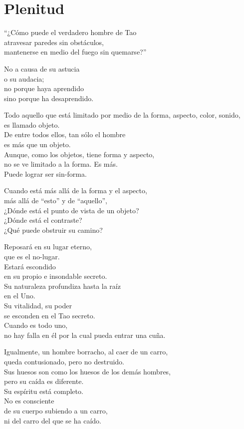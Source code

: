 \documentclass[book,b5paper,hidelinks,final]{memoir}
\begin{document}
	\chapter*{Plenitud}
	
	``¿Cómo puede el verdadero hombre de Tao\\
	atravesar paredes sin obstáculos,\\
	mantenerse en medio del fuego sin quemarse?''
	
	No a causa de su astucia\\
	o su audacia;\\
	no porque haya aprendido\\
	sino porque ha desaprendido.
	
	Todo aquello que está limitado por medio de la forma, aspecto, color,
	sonido,\\
	es llamado objeto.\\
	De entre todos ellos, tan sólo el hombre\\
	es más que un objeto.\\
	Aunque, como los objetos, tiene forma y aspecto,\\
	no se ve limitado a la forma. Es más.\\
	Puede lograr ser sin-forma.
	
	Cuando está más allá de la forma y el aspecto,\\
	más allá de ``esto'' y de ``aquello'',\\
	¿Dónde está el punto de vista de un objeto?\\
	¿Dónde está el contraste?\\
	¿Qué puede obstruir su camino?
	
	Reposará en su lugar eterno,\\
	que es el no-lugar.\\
	Estará escondido\\
	en su propio e insondable secreto.\\
	Su naturaleza profundiza hasta la raíz\\
	en el Uno.\\
	Su vitalidad, su poder\\
	se esconden en el Tao secreto.\\
	Cuando es todo uno,\\
	no hay falla en él por la cual pueda entrar una cuña.
	
	Igualmente, un hombre borracho, al caer de un carro,\\
	queda contusionado, pero no destruido.\\
	Sus huesos son como los huesos de los demás hombres,\\
	pero su caída es diferente.\\
	Su espíritu está completo.\\
	No es consciente\\
	de su cuerpo subiendo a un carro,\\
	ni del carro del que se ha caído.
	
\end{document}
